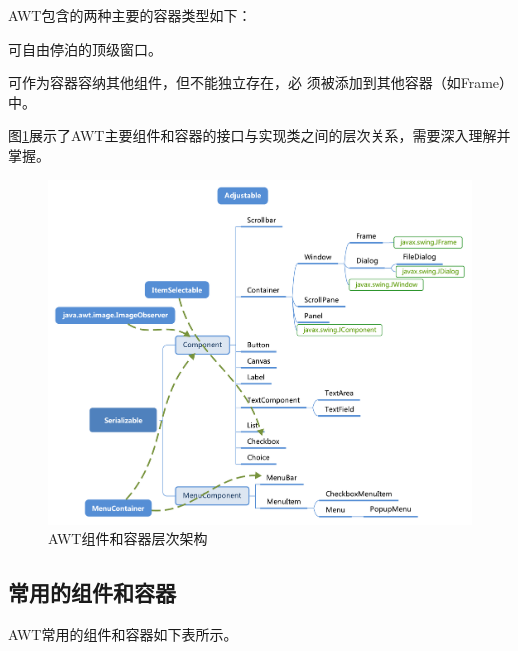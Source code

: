 AWT包含的两种主要的容器类型如下：
  
\begin{description}\kai
\item[\fbox{java.awt.Window}] 可自由停泊的顶级窗口。
\item[\fbox{java.awt.Panel}] 可作为容器容纳其他组件，但不能独立存在，必
  须被添加到其他容器（如Frame）中。
\end{description}

图\ref{fig:fig-AWT-component-arch}展示了AWT主要组件和容器的接口与实现类之间的层次关系，需要深入理解并掌握。

\begin{figure}[htb]
  \centering
  \includegraphics[width=\textwidth]{images/Java-GUI-programming/fig-AWT-component-arch.pdf}
  \caption{AWT组件和容器层次架构}
  \label{fig:fig-AWT-component-arch}
\end{figure}

\subsection{常用的组件和容器}

AWT常用的组件和容器如下表所示。

